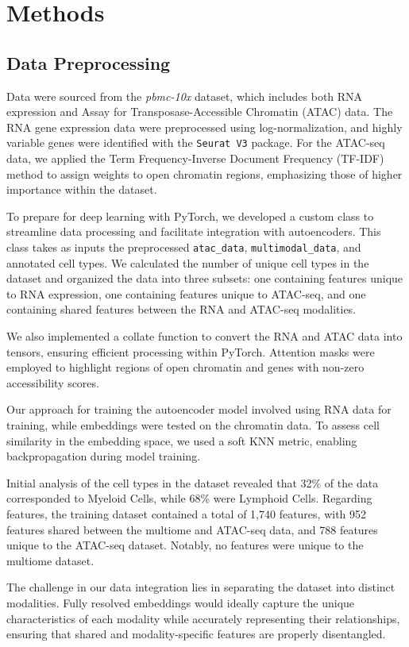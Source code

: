 \documentclass[11pt,a4paper]{article}
\begin{document}
\section{Methods}
\subsection{Data Preprocessing}
Data were sourced from the \textit{pbmc-10x} dataset, which includes both RNA expression and Assay for Transposase-Accessible Chromatin (ATAC) data. The RNA gene expression data were preprocessed using log-normalization, and highly variable genes were identified with the \texttt{Seurat V3} package. For the ATAC-seq data, we applied the Term Frequency-Inverse Document Frequency (TF-IDF) method to assign weights to open chromatin regions, emphasizing those of higher importance within the dataset.

To prepare for deep learning with PyTorch, we developed a custom class to streamline data processing and facilitate integration with autoencoders. This class takes as inputs the preprocessed \texttt{atac\_data}, \texttt{multimodal\_data}, and annotated cell types. We calculated the number of unique cell types in the dataset and organized the data into three subsets: one containing features unique to RNA expression, one containing features unique to ATAC-seq, and one containing shared features between the RNA and ATAC-seq modalities.

We also implemented a collate function to convert the RNA and ATAC data into tensors, ensuring efficient processing within PyTorch. Attention masks were employed to highlight regions of open chromatin and genes with non-zero accessibility scores.

Our approach for training the autoencoder model involved using RNA data for training, while embeddings were tested on the chromatin data. To assess cell similarity in the embedding space, we used a soft KNN metric, enabling backpropagation during model training.

Initial analysis of the cell types in the dataset revealed that 32\% of the data corresponded to Myeloid Cells, while 68\% were Lymphoid Cells. Regarding features, the training dataset contained a total of 1,740 features, with 952 features shared between the multiome and ATAC-seq data, and 788 features unique to the ATAC-seq dataset. Notably, no features were unique to the multiome dataset.

The challenge in our data integration lies in separating the dataset into distinct modalities. Fully resolved embeddings would ideally capture the unique characteristics of each modality while accurately representing their relationships, ensuring that shared and modality-specific features are properly disentangled.
\end{document}
